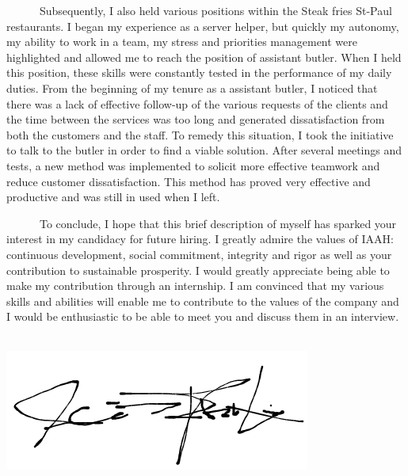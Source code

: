 \documentclass{article}
\begin{document}
\begin{textblock}{11.35}
\bigskip
	
	\ \ \ \ \ \ Subsequently, I also held various positions within the Steak fries St-Paul restaurants. I began my experience as a server helper, but quickly my autonomy, my ability to work in a team, my stress and priorities management were highlighted and allowed me to reach the position of assistant butler. When I held this position, these skills were constantly tested in the performance of my daily duties. From the beginning of my tenure as a assistant butler, I noticed that there was a lack of effective follow-up of the various requests of the clients and the time between the services was too long and generated dissatisfaction from both the customers and the staff. To remedy this situation, I took the initiative to talk to the butler in order to find a viable solution. After several meetings and tests, a new method was implemented to solicit more effective teamwork and reduce customer dissatisfaction. This method has proved very effective and productive and was still in used when I left.
\bigskip
	

	\ \ \ \ \ \ To conclude, I hope that this brief description of myself has sparked your interest in my candidacy for future hiring. I greatly admire the values of IAAH: continuous development, social commitment, integrity and rigor as well as your contribution to sustainable prosperity. I would greatly appreciate being able to make my contribution through an internship. I am convinced that my various skills and abilities will enable me to contribute to the values of the company and I would be enthusiastic to be able to meet you and discuss them in an interview.
\bigskip

\textcolor{black}{} \\

\includegraphics[height=5\baselineskip]{signature.png}


\end{textblock}
\end{document}
